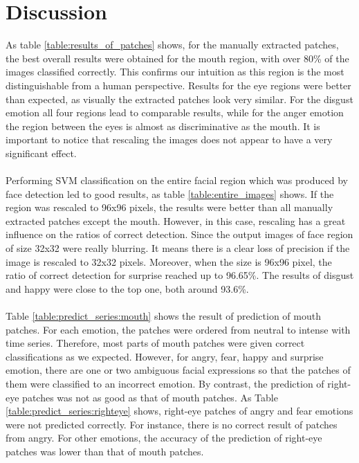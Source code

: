 \section{Discussion}
As table \ref{table:results_of_patches} shows, for the manually extracted patches, the best overall results were obtained for the mouth region, with over 80\% of the images classified correctly.
This confirms our intuition as this region is the most distinguishable
from a human perspective. Results for the eye regions were better than expected, as visually the extracted patches look very similar. For the disgust emotion all
four regions lead to comparable results, while for the anger emotion the region between the eyes is almost as discriminative as the mouth. It is important to notice that rescaling the images does not appear to have a very significant effect.
\\
\\
Performing SVM classification on the entire facial region which was produced by face detection led to good results, as table \ref{table:entire_images} shows. If the region was rescaled to 96x96 pixels, the results were better than all manually extracted
patches except the mouth. However, in this case, rescaling has a great influence on the ratios of correct detection. Since the output images of face region of size 32x32 were really blurring. It means there is a clear loss of precision if the image is rescaled to 32x32 pixels. Moreover, when the size is 96x96 pixel, the ratio of correct detection for surprise reached up to 96.65\%. The results of disgust and happy were close to the top one, both around 93.6\%.
\\
\\
Table \ref{table:predict_series:mouth} shows the result of prediction of mouth patches. For each emotion, the patches were ordered from neutral to intense with time series. Therefore, most parts of mouth patches were given correct classifications as we expected. However, for angry, fear, happy and surprise emotion, there are one or two ambiguous facial expressions so that the patches of them were classified to an incorrect emotion. By contrast, the prediction of right-eye patches was not as good as that of mouth patches. As Table \ref{table:predict_series:righteye} shows, right-eye patches of angry and fear emotions were not predicted correctly. For instance, there is no correct result of patches from angry. For other emotions, the accuracy of the prediction of right-eye patches was lower than that of mouth patches.
\\
